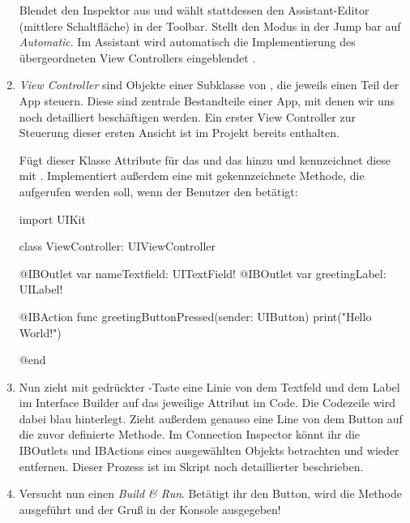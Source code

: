 \documentclass[parskip=half, final]{scrreprt}
\begin{document}
\begin{lecture}
\begin{enumerate}
Blendet den Inspektor aus und wählt stattdessen den Assistant-Editor (mittlere Schaltfläche) in der Toolbar. Stellt den Modus in der Jump bar auf \emph{Automatic}. Im Assistant wird automatisch die Implementierung des übergeordneten View Controllers eingeblendet .


\item \emph{View Controller} sind Objekte einer Subklasse von , die jeweils einen Teil der App steuern. Diese sind zentrale Bestandteile einer App, mit denen wir uns noch detailliert beschäftigen werden. Ein erster View Controller zur Steuerung dieser ersten Ansicht ist im Projekt bereits enthalten.

Fügt dieser Klasse  Attribute für das  und das  hinzu und kennzeichnet diese mit . Implementiert außerdem eine mit  gekennzeichnete Methode, die aufgerufen werden soll, wenn der Benutzer den  betätigt:

\begin{swiftcode}
import UIKit

class ViewController: UIViewController {

    @IBOutlet var nameTextfield: UITextField!
    @IBOutlet var greetingLabel: UILabel!

    @IBAction func greetingButtonPressed(sender: UIButton) {
        print("Hello World!")
    }
    
}
@end
\end{swiftcode}

\item Nun zieht mit gedrückter \keys{\ctrl}-Taste eine Linie von dem Textfeld und dem Label im Interface Builder auf das jeweilige Attribut im Code. Die Codezeile wird dabei blau hinterlegt. Zieht außerdem genauso eine Line von dem Button auf die zuvor definierte Methode. Im Connection Inspector könnt ihr die IBOutlets und IBActions eines ausgewählten Objekts betrachten und wieder entfernen. Dieser Prozess ist im Skript noch detaillierter beschrieben.

\item Versucht nun einen \emph{Build \& Run}. Betätigt ihr den Button, wird die Methode ausgeführt und der Gruß  in der Konsole ausgegeben!


\end{enumerate}
\end{lecture}
\end{document}
